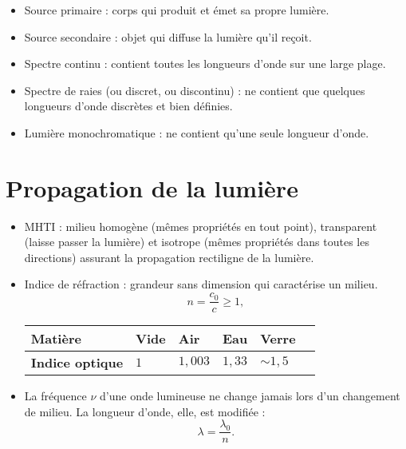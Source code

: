 \documentclass[a4paper,12pt]{article}
\begin{document}
\begin{itemize}
    \item Source primaire : corps qui produit et émet sa propre lumière.
    
    \item Source secondaire : objet qui diffuse la lumière qu'il reçoit.
    
    \item Spectre continu : contient toutes les longueurs d'onde sur une large plage.
    
    \item Spectre de raies (ou discret, ou discontinu) : ne contient que quelques longueurs d'onde discrètes et bien définies.

    \item Lumière monochromatique : ne contient qu'une seule longueur d'onde.

\end{itemize}


\section{Propagation de la lumière}

\begin{itemize}
    \item MHTI : milieu homogène (mêmes propriétés en tout point), transparent (laisse passer la lumière) et isotrope (mêmes propriétés dans toutes les directions) assurant la propagation rectiligne de la lumière.

    \item Indice de réfraction : grandeur sans dimension qui caractérise un milieu.
    \[ n = \frac{c_0}{c} \ge 1, \]
    \newlength{\colwidth}
    \setlength{\colwidth}{1.2cm}
    \begin{center}
    \begin{tabular}{|p{3cm}|P{\colwidth}|P{\colwidth}|P{\colwidth}|P{\colwidth}|P{\colwidth}|}
        \hline
        \textbf{Matière} & Vide & Air & Eau & Verre  \\
        \hline
        \textbf{Indice optique} & $1$ & $1,003$ & $1,33$ & $\sim 1,5$  \\
        \hline
    \end{tabular}
    \end{center}

    \item La fréquence $\nu$ d'une onde lumineuse ne change jamais lors d'un changement de milieu. La longueur d'onde, elle, est modifiée :
    \[ \lambda = \frac{\lambda_0}{n}. \]
\end{itemize}
\end{document}
